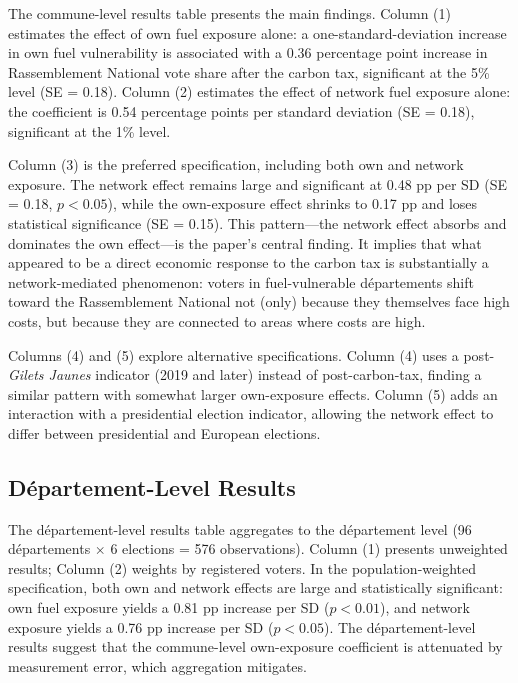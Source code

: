 \documentclass[12pt]{article}
\newcommand{\rn}{Rassemblement National}
\newcommand{\gj}{\textit{Gilets Jaunes}}
\newcommand{\dept}{d\'{e}partement}
\newcommand{\depts}{d\'{e}partements}
\begin{document}
The commune-level results table presents the main findings. Column (1) estimates the effect of own fuel exposure alone: a one-standard-deviation increase in own fuel vulnerability is associated with a 0.36 percentage point increase in \rn{} vote share after the carbon tax, significant at the 5\% level (SE = 0.18). Column (2) estimates the effect of network fuel exposure alone: the coefficient is 0.54 percentage points per standard deviation (SE = 0.18), significant at the 1\% level.



Column (3) is the preferred specification, including both own and network exposure. The network effect remains large and significant at 0.48 pp per SD (SE = 0.18, $p < 0.05$), while the own-exposure effect shrinks to 0.17 pp and loses statistical significance (SE = 0.15). This pattern---the network effect absorbs and dominates the own effect---is the paper's central finding. It implies that what appeared to be a direct economic response to the carbon tax is substantially a network-mediated phenomenon: voters in fuel-vulnerable \depts{} shift toward the \rn{} not (only) because they themselves face high costs, but because they are connected to areas where costs are high.

Columns (4) and (5) explore alternative specifications. Column (4) uses a post-\gj{} indicator (2019 and later) instead of post-carbon-tax, finding a similar pattern with somewhat larger own-exposure effects. Column (5) adds an interaction with a presidential election indicator, allowing the network effect to differ between presidential and European elections.

\subsection{D\'{e}partement-Level Results}



The d\'{e}partement-level results table aggregates to the \dept{} level (96 \depts{} $\times$ 6 elections = 576 observations). Column (1) presents unweighted results; Column (2) weights by registered voters. In the population-weighted specification, both own and network effects are large and statistically significant: own fuel exposure yields a 0.81 pp increase per SD ($p < 0.01$), and network exposure yields a 0.76 pp increase per SD ($p < 0.05$). The \dept{}-level results suggest that the commune-level own-exposure coefficient is attenuated by measurement error, which aggregation mitigates.
\end{document}
